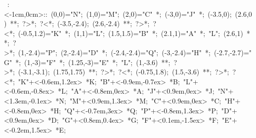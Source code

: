 %

\hbox{
\xy    <0cm,1cm>:<-1cm,0cm>::
       (0,0)="N"; (1,0)="M"; (2,0)="C" *{\bullet}; (-3,0)="J" *{\bullet}; 
          (-3.5,0); (2.6,0)  **\dir{-}; ?>*\dir{>}; ?<*\dir{<};
          (-3.5,-2.4); (2.6,-2.4)  **\dir{-}; ?>*\dir{>}; ?<*\dir{<};
       (-0.5,1.2)="K" *{\bullet}; (1,1)="L"; (1.5,1.5)="B" *{\bullet}; 
          (2.1,1)="A" *{\bullet}; 
          "L"; (2.6,1)  **\dir{-}; ?>*\dir{>}; 
       (1,-2.4)="P"; (2,-2.4)="D"  *{\bullet}; (-2.4,-2.4)="Q"; 
          (-3,-2.4)="H" *{\bullet}; (-2.7,-2.7)="G" *{\bullet};
          (1,-3)="F" *{\bullet}; (1.25,-3)="E" *{\bullet};
          "L"; (1,-3.6)  **\dir{-}; ?>*\dir{>}; 
          (-3.1,-3.1); (1.75,1.75)  **\dir{-}; ?>*\dir{>}; ?<*\dir{<};
          (-0.75,1.8); (1.5,-3.6)  **\dir{-}; ?>*\dir{>}; ?<*\dir{<};
       "K"+<-0.6em,1.2ex> *{K};  "B"+<-0.9em,-0.7ex> *{B};
       "L"+<-0.6em,-0.8ex> *{L};  "A"+<-0.8em,0ex> *{A};
       "J"+<0.9em,0ex> *{J};  "N"+<1.3em,-0.1ex> *{N};
       "M"+<0.9em,1.3ex> *{M};  "C"+<0.9em,0ex> *{C};
       "H"+<-0.8em,0ex> *{H};  "Q"+<-0.7em,3ex> *{Q};
       "P"+<-0.8em,1.3ex> *{P};  "D"+<0.9em,0ex> *{D};
       "G"+<0.8em,0.4ex> *{G};  "F"+<0.1em,-1.5ex> *{F};
       "E"+<-0.2em,1.5ex> *{E};  
              \endxy}


